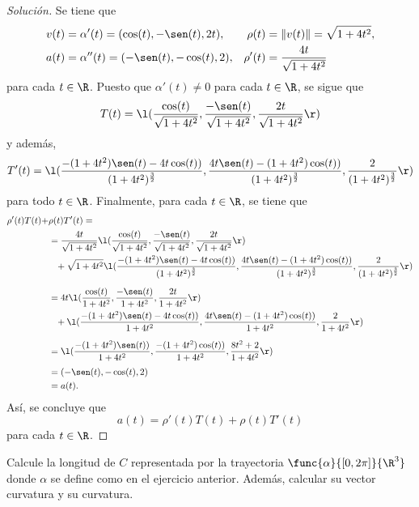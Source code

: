 \documentclass[a4,11pt]{aleph-notas}
\begin{document}
\begin{proof}[Solución]
Se tiene que
	\begin{align*}
        v(t)
        &=\alpha'(t)=(\cos(t),-\sen(t),2t),
        &\rho(t)&=\|v(t)\|=\sqrt{1+4t^2},\\
        a(t)&=\alpha''(t)=(-\sen(t),-\cos(t),2),
        &\rho'(t)&=\dfrac{4t}{\sqrt{1+4t^2}}
	\end{align*}
	para cada $t\in\R$. Puesto que $\alpha'(t)\neq0$ para cada $t\in\R$, se sigue que
	\begin{align*}
		T(t)=\l(\dfrac{\cos(t)}{\sqrt{1+4t^2}},\dfrac{-\sen(t)}{\sqrt{1+4t^2}},\dfrac{2t}{\sqrt{1+4t^2}}\r)
	\end{align*}
	y además, 
	\[
		T'(t)
		=\l(\dfrac{-(1+4t^2) \sen(t) -4t\cos(t))}{(1 + 4 t^2)^\frac{3}{2}},
		\dfrac{ 4t\sen(t)-(1+4t^2) \cos(t))}{(1 + 4 t^2)^\frac{3}{2}},
		\dfrac{ 2}{(1 + 4 t^2)^\frac{3}{2}}\r)
	\]
	para todo $t\in\R$. Finalmente, para cada $t\in\R$, se tiene que
	\begin{align*}
		\rho'(t) T(t)+&\rho(t) T' (t)=\\
		&= \dfrac{4t}{\sqrt{1+4t^2}}\l(\dfrac{\cos(t)}{\sqrt{1+4t^2}},\dfrac{-\sen(t)}{\sqrt{1+4t^2}},\dfrac{2t}{\sqrt{1+4t^2}}\r)\\
	    &\phantom{=}+\sqrt{1+4t^2}\l(\dfrac{-(1+4t^2) \sen(t) -4t\cos(t))}{(1 + 4t^2)^\frac{3}{2}},
			\dfrac{ 4t\sen(t)-(1+4t^2) \cos(t))}{(1 + 4 t^2)^\frac{3}{2}},
			\dfrac{ 2}{(1 + 4 t^2)^\frac{3}{2}}\r)\\[2mm]
		&= 4t\l(\dfrac{\cos(t)}{1+4t^2},\dfrac{-\sen(t)}{1+4t^2},\dfrac{2t}{1+4t^2}\r)\\
		&\phantom{=}+\l(\dfrac{-(1+4t^2) \sen(t) -4t\cos(t))}{1 + 4t^2},
			\dfrac{ 4t\sen(t)-(1+4t^2) \cos(t))}{1 + 4t^2},
			\dfrac{ 2}{1 + 4t^2}\r)\\[2mm]
		&=\l(\dfrac{-(1+4t^2) \sen(t))}{1 + 4t^2},
			\dfrac{-(1+4t^2) \cos(t))}{1 + 4t^2},
			\dfrac{8t^2+2}{1 + 4t^2}\r)\\[1mm]
		&=(-\sen(t),-\cos(t),2)\\
		&=a(t).
	\end{align*}
	Así, se concluye que
	\[
		a(t)=\rho'(t) T(t)+\rho(t) T' (t)
	\]
	para cada $t\in\R$.
\end{proof}

\begin{ejer}
Calcule la longitud de $C$ representada por la trayectoria $\func{\alpha}{[0,2\pi]}{\R^3}$ donde $\alpha$ se define como en el ejercicio anterior. Además, calcular su vector curvatura y su curvatura.
\end{ejer}
\end{document}
